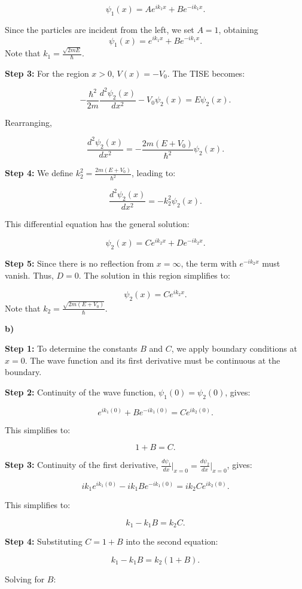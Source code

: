 \documentclass{article}
\begin{document}
\[ \psi_1(x) = Ae^{ik_1x} + Be^{-ik_1x}. \]

Since the particles are incident from the left, we set $A=1$, obtaining
\[ \psi_1(x) = e^{ik_1x} + Be^{-ik_1x}. \]
Note that $k_1 = \frac{\sqrt{2mE}}{\hbar}$.

\textbf{Step 3:} For the region $x > 0$, $V(x) = -V_0$. The TISE becomes:

\[ -\frac{\hbar^2}{2m} \frac{d^2 \psi_2(x)}{dx^2} - V_0\psi_2(x) = E\psi_2(x). \]

Rearranging,

\[ \frac{d^2 \psi_2(x)}{dx^2} = -\frac{2m(E + V_0)}{\hbar^2}\psi_2(x). \]

\textbf{Step 4:} We define $k_2^2 = \frac{2m(E + V_0)}{\hbar^2}$, leading to:

\[ \frac{d^2 \psi_2(x)}{dx^2} = -k_2^2 \psi_2(x). \]

This differential equation has the general solution:

\[ \psi_2(x) = Ce^{ik_2x} + De^{-ik_2x}. \]

\textbf{Step 5:} Since there is no reflection from $x = \infty$, the term with $e^{-ik_2x}$ must vanish. Thus, $D = 0$. The solution in this region simplifies to:

\[ \psi_2(x) = Ce^{ik_2x}. \]
Note that $k_2 = \frac{\sqrt{2m(E+V_0)}}{\hbar}$.

\textbf{b)}

\textbf{Step 1:} To determine the constants $B$ and $C$, we apply boundary conditions at $x = 0$. The wave function and its first derivative must be continuous at the boundary.

\textbf{Step 2:} Continuity of the wave function, $\psi_1(0) = \psi_2(0)$, gives:

\[ e^{ik_1(0)} + Be^{-ik_1(0)} = Ce^{ik_2(0)}. \]

This simplifies to:

\[ 1 + B = C. \]

\textbf{Step 3:} Continuity of the first derivative, $\frac{d\psi_1}{dx}\bigg|_{x=0} = \frac{d\psi_2}{dx}\bigg|_{x=0}$, gives:

\[ ik_1e^{ik_1(0)} - ik_1Be^{-ik_1(0)} = ik_2Ce^{ik_2(0)}. \]

This simplifies to:

\[ k_1 - k_1B = k_2C. \]

\textbf{Step 4:} Substituting $C = 1 + B$ into the second equation:

\[ k_1 - k_1B = k_2(1 + B). \]

Solving for $B$:
\end{document}
